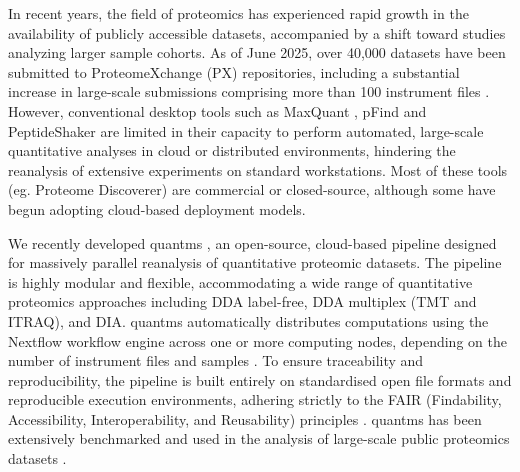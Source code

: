 \documentclass[12pt]{article}
\begin{document}
In recent years, the field of proteomics has experienced rapid growth in the availability of publicly accessible datasets, accompanied by a shift toward studies analyzing larger sample cohorts. As of June 2025, over 40,000 datasets have been submitted to ProteomeXchange (PX) repositories, including a substantial increase in large-scale submissions comprising more than 100 instrument files \cite{perez-riverol_pride_2025}. However, conventional desktop tools such as MaxQuant \cite{cox_maxquant_2008}, pFind \cite{wang_pfind_2007} and PeptideShaker \cite{vaudel2015peptideshaker} are limited in their capacity to perform automated, large-scale quantitative analyses in cloud or distributed environments, hindering the reanalysis of extensive experiments on standard workstations. Most of these tools (eg. Proteome Discoverer) are commercial or closed-source, although some have begun adopting cloud-based deployment models.

We recently developed quantms \cite{dai_quantms_2024}, an open-source, cloud-based pipeline designed for massively parallel reanalysis of quantitative proteomic datasets. The pipeline is highly modular and flexible, accommodating a wide range of quantitative proteomics approaches including DDA label-free, DDA multiplex (TMT and ITRAQ), and DIA.
quantms automatically distributes computations using the Nextflow workflow engine across one or more computing nodes, depending on the number of instrument files and samples \cite{di_tommaso_nextflow_2017}. To ensure traceability and reproducibility, the pipeline is built entirely on standardised open file formats and reproducible execution environments, adhering strictly to the FAIR (Findability, Accessibility, Interoperability, and Reusability) principles \cite{wilkinson_fair_2016}. quantms has been extensively benchmarked and used in the analysis of large-scale public proteomics datasets \cite{dai_quantms_2024,bai2023lfq, ZHENG2025105440}.

\end{document}
